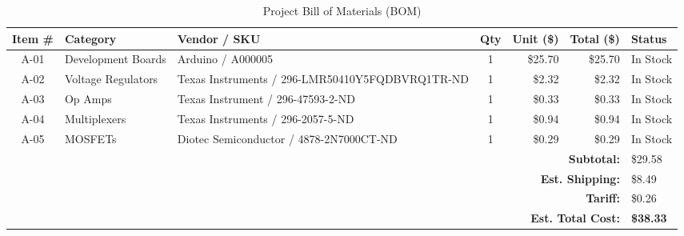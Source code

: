 \documentclass{article}
\begin{document}
\begin{table}[htbp]
\centering
\caption{Project Bill of Materials (BOM)}
\label{tab:project_bom}
\small
\begin{tabularx}{\textwidth}{c l >{\raggedright\arraybackslash}X c r r l}
\toprule
\textbf{Item \#} & \textbf{Category} & \textbf{Vendor / SKU} & \textbf{Qty} & \textbf{Unit (\$)} & \textbf{Total (\$)} & \textbf{Status} \\
\midrule
A-01 & Development Boards & Arduino / A000005 & 1 & \$25.70 & \$25.70 & In Stock \\
A-02 & Voltage Regulators & Texas Instruments / 296-LMR50410Y5FQDBVRQ1TR-ND & 1 & \$2.32 & \$2.32 & In Stock \\
A-03 & Op Amps & Texas Instrument / 296-47593-2-ND & 1 & \$0.33 & \$0.33 & In Stock \\
A-04 & Multiplexers & Texas Instruments / 296-2057-5-ND & 1 & \$0.94 & \$0.94 & In Stock \\
A-05 & MOSFETs & Diotec Semiconductor / 4878-2N7000CT-ND & 1 & \$0.29 & \$0.29 & In Stock \\
\midrule
\multicolumn{6}{r}{\textbf{Subtotal:}} & \$29.58 & \\
\multicolumn{6}{r}{\textbf{Est. Shipping:}} & \$8.49 & \\
\multicolumn{6}{r}{\textbf{Tariff:}} & \$0.26 & \\
\midrule
\multicolumn{6}{r}{\textbf{Est. Total Cost:}} & \textbf{\$38.33} & \\
\bottomrule
\end{tabularx}
\end{table}

\newpage

\newpage
\end{document}
